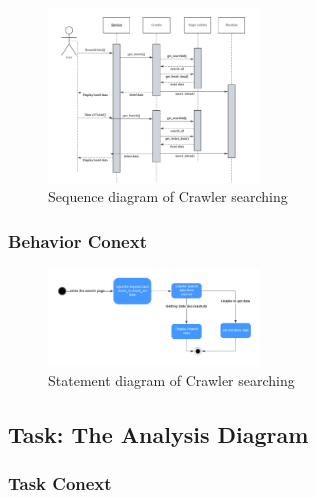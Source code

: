\documentclass[conference]{IEEEtran}
\begin{document}
\begin{figure}[htbp]
	\centerline{\includegraphics[width=0.5\textwidth]{image/crawler searching sequence1.pdf}}
	\caption{Sequence diagram of Crawler searching }
	\label{sequence1}
\end{figure}

\subsubsection{\textbf{Behavior Conext }}

\begin{figure}[htbp]
	\centerline{\includegraphics[width=0.5\textwidth]{image/crawler searching statement1.pdf}}
	\caption{Statement diagram of Crawler searching }
	\label{statement1}
\end{figure}



\subsection{\textbf{Task: The Analysis Diagram}}


\subsubsection{\textbf{Task Conext }}

\textbf{}
\end{document}

